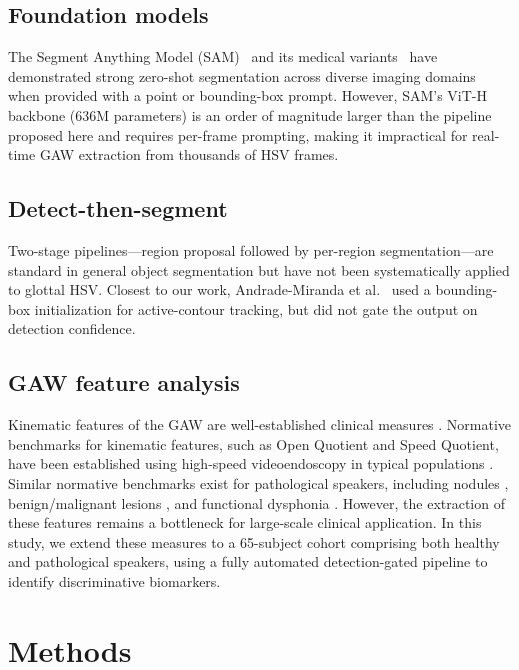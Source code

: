 \documentclass[preprint,12pt]{elsarticle}
\newcommand{\gaw}{GAW}
\begin{document}
\subsection{Foundation models}
The Segment Anything Model (SAM)~\cite{kirillov2023sam} and its medical
variants~\cite{ma2024medsam} have demonstrated strong zero-shot
segmentation across diverse imaging domains when provided with a point or
bounding-box prompt.
However, SAM's ViT-H backbone (\num{636}M parameters) is an order of
magnitude larger than the pipeline proposed here and requires per-frame
prompting, making it impractical for real-time \gaw{} extraction from
thousands of HSV frames.

\subsection{Detect-then-segment}
Two-stage pipelines---region proposal followed by per-region segmentation---are
standard in general object segmentation \cite{he2017maskrcnn} but have not
been systematically applied to glottal HSV. Closest to our work,
Andrade-Miranda et al.\ \cite{andrade2015glottal} used a bounding-box
initialization for active-contour tracking, but did not gate the output
on detection confidence.

\subsection{\gaw{} feature analysis}
Kinematic features of the \gaw{} are well-established clinical measures
\cite{patel2013laser,little2007glottal}. Normative benchmarks for kinematic features,
such as Open Quotient and Speed Quotient, have been established using high-speed videoendoscopy
in typical populations \cite{patel2015kinematic}. Similar normative benchmarks exist for pathological
speakers, including nodules \cite{patel2016nodules}, benign/malignant lesions \cite{hoffman2025comparative},
and functional dysphonia \cite{schraut2025hoarseness}.
However, the extraction of these
features remains a bottleneck for large-scale clinical application. In this study, we extend
these measures to a \num{65}-subject cohort comprising both healthy and pathological speakers, using a
fully automated detection-gated pipeline to identify discriminative biomarkers.


\section{Methods}
\label{sec:method}
\end{document}
